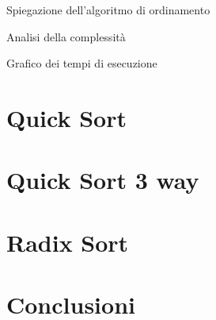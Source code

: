 \documentclass[a4paper, 12pt, oneside]{book}
\begin{document}
Spiegazione dell'algoritmo di ordinamento

Analisi della complessità

Grafico dei tempi di esecuzione


\chapter{Quick Sort}\label{chap:Quick Sort} %


\chapter{Quick Sort 3 way}\label{chap:Quick Sort 3 way} %


\chapter{Radix Sort}\label{chap:Radix Sort} %


\chapter{Conclusioni}\label{chap:Conclusioni} %

\end{document}

